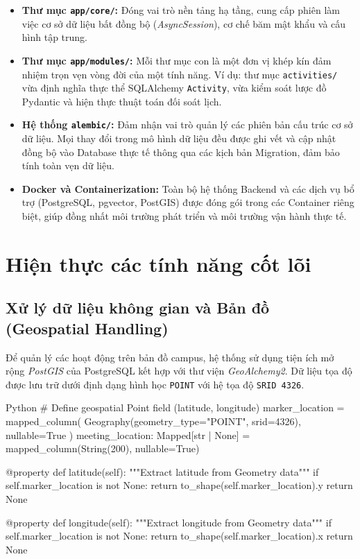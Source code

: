 \begin{itemize}
    \item \textbf{Thư mục \texttt{app/core/}:} Đóng vai trò nền tảng hạ tầng, cung cấp phiên làm việc cơ sở dữ liệu bất đồng bộ (\textit{AsyncSession}), cơ chế băm mật khẩu và cấu hình tập trung.
    
    \item \textbf{Thư mục \texttt{app/modules/}:} Mỗi thư mục con là một đơn vị khép kín đảm nhiệm trọn vẹn vòng đời của một tính năng. Ví dụ: thư mục \texttt{activities/} vừa định nghĩa thực thể SQLAlchemy \texttt{Activity}, vừa kiểm soát lược đồ Pydantic và hiện thực thuật toán đối soát lịch.
    
    \item \textbf{Hệ thống \texttt{alembic/}:} Đảm nhận vai trò quản lý các phiên bản cấu trúc cơ sở dữ liệu. Mọi thay đổi trong mô hình dữ liệu đều được ghi vết và cập nhật đồng bộ vào Database thực tế thông qua các kịch bản Migration, đảm bảo tính toàn vẹn dữ liệu.
    
    \item \textbf{Docker và Containerization:} Toàn bộ hệ thống Backend và các dịch vụ bổ trợ (PostgreSQL, pgvector, PostGIS) được đóng gói trong các Container riêng biệt, giúp đồng nhất môi trường phát triển và môi trường vận hành thực tế.
\end{itemize}

\section{Hiện thực các tính năng cốt lõi}

\subsection{Xử lý dữ liệu không gian và Bản đồ (Geospatial Handling)}
Để quản lý các hoạt động trên bản đồ campus, hệ thống sử dụng tiện ích mở rộng \textit{PostGIS} của PostgreSQL kết hợp với thư viện \textit{GeoAlchemy2}. Dữ liệu tọa độ được lưu trữ dưới định dạng hình học \texttt{POINT} với hệ tọa độ \texttt{SRID 4326}.

\begin{mycode}{Python}
# Define geospatial Point field (latitude, longitude)
marker_location = mapped_column(
    Geography(geometry_type="POINT", srid=4326), nullable=True
)
meeting_location: Mapped[str | None] = mapped_column(String(200), nullable=True)

@property
def latitude(self):
    """Extract latitude from Geometry data"""
    if self.marker_location is not None:
        return to_shape(self.marker_location).y
    return None

@property
def longitude(self):
    """Extract longitude from Geometry data"""
    if self.marker_location is not None:
        return to_shape(self.marker_location).x
    return None
\end{mycode}

